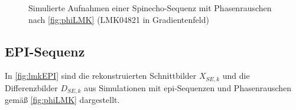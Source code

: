 \begin{figure}[H]
	\hfill
	\hfill
	\caption[LMK04821 Phasenrauschen (Spinecho-Sequenz)]{Simulierte Aufnahmen einer Spinecho-Sequenz mit Phasenrauschen nach \autoref{fig:phiLMK}  (LMK04821 in Gradientenfeld)}
	\label{fig:lmkSE}	
\end{figure}

\clearpage
\subsection{EPI-Sequenz}
In \autoref{fig:lmkEPI} sind die rekonstruierten Schnittbilder $X_{SE,k}$ und die Differenzbilder $D_{SE,k}$ aus Simulationen mit \gls{epi}-Sequenzen und Phasenrauschen gemäß \autoref{fig:phiLMK} dargestellt.

